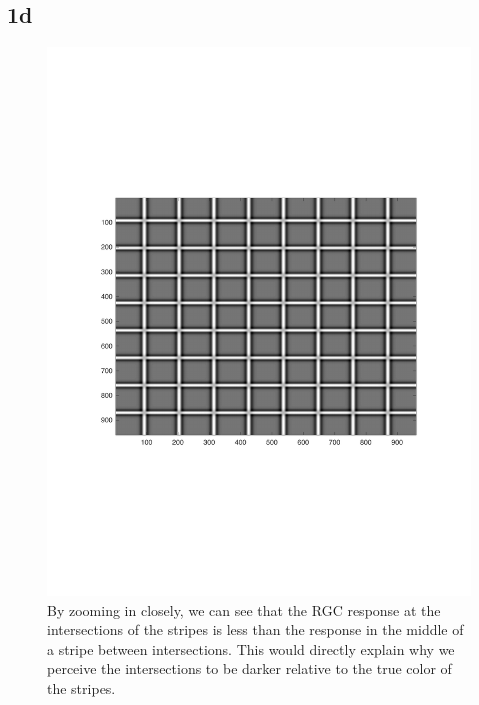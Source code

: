 \documentclass[]{article}
\begin{document}
\subsection*{1d}
\begin{figure}[H]
    \centering
    \includegraphics{problem1D.pdf}
    \caption{By zooming in closely, we can see that the RGC response at the intersections of the stripes is less than the response in the middle of a stripe between intersections. This would directly explain why we perceive the intersections to be darker relative to the true color of the stripes.}
    \label{fig:my_label}
\end{figure}
\end{document}
